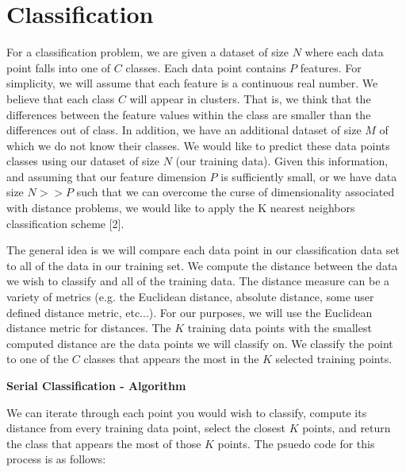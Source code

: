 \section{Classification}

\vspace{5 mm}
\noindent
For a classification problem, we are given a dataset of size $N$ where each 
data point falls into one of $C$ classes. Each data point contains $P$ features. 
For simplicity, we will assume that each feature is a continuous real number. 
We believe that each class $C$ will appear in clusters. That is, we think that 
the differences between the feature values within the class are smaller than 
the differences out of class. In addition, we have an additional dataset of 
size $M$ of which we do not know their classes. We would like to predict these 
data points classes using our dataset of size $N$ (our training data). Given 
this information, and assuming that our feature dimension $P$ is sufficiently 
small, or we have data size $N >> P$ such that we can overcome the curse of 
dimensionality associated with distance problems, we would like to apply the 
K nearest neighbors classification scheme [2].

\vspace{5 mm}
\noindent
The general idea is we will compare each data point in our classification data 
set to all of the data in our training set. We compute the distance between 
the data we wish to classify and all of the training data. The distance measure 
can be a variety of metrics (e.g. the Euclidean distance, absolute distance, 
some user defined distance metric, etc...). For our purposes, we will use the 
Euclidean distance metric for distances. The $K$ training data points with the 
smallest computed distance are the data points we will classify on. We classify 
the point to one of the $C$ classes that appears the most in the $K$ selected 
training points.

\vspace{5 mm}
\noindent
\textbf{Serial Classification - Algorithm}

\vspace{5 mm}
\noindent
We can iterate through each point you would wish to classify, compute its 
distance from every training data point, select the closest $K$ points, and 
return the class that appears the most of those $K$ points. The psuedo code for 
this process is as follows:


